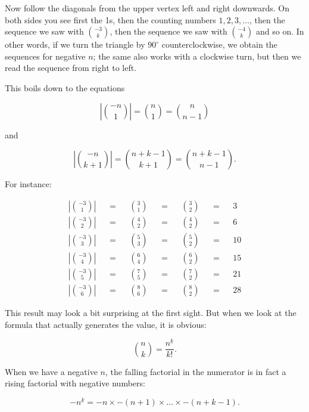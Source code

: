\documentclass[tikz]{scrreprt}
\begin{document}
Now follow the diagonals from the upper vertex
left and right downwards.
On both sides you see first the 1s,
then the counting numbers $1,2,3,\dots$,
then the sequence we saw with $\binom{-3}{k}$,
then the sequence we saw with $\binom{-4}{k}$
and so on.
In other words, if we turn the triangle
by $90^{\circ}$ counterclockwise, 
we obtain the sequences for negative $n$;
the same also works with a clockwise turn,
but then we read the sequence from right to left.

This boils down to the equations

\begin{equation}\label{eq:NegPos_1}
\left\lvert\binom{-n}{1}\right\rvert 
= \binom{n}{1}
= \binom{n}{n-1}
\end{equation}

and

\begin{equation}\label{eq:NegPos_k}
\left\lvert\binom{-n}{k+1}\right\rvert 
= \binom{n+k-1}{k+1}
= \binom{n+k-1}{n-1}.
\end{equation}

For instance:

\begin{align*}
\left\lvert\binom{-3}{1}\right\rvert &&=&&\binom{3}{1} &&=&&\binom{3}{2} &&=&& 3\\
\left\lvert\binom{-3}{2}\right\rvert &&=&&\binom{4}{2} &&=&&\binom{4}{2} &&=&& 6\\
\left\lvert\binom{-3}{3}\right\rvert &&=&&\binom{5}{3} &&=&&\binom{5}{2} &&=&& 10\\
\left\lvert\binom{-3}{4}\right\rvert &&=&&\binom{6}{4} &&=&&\binom{6}{2} &&=&& 15\\
\left\lvert\binom{-3}{5}\right\rvert &&=&&\binom{7}{5} &&=&&\binom{7}{2} &&=&& 21\\
\left\lvert\binom{-3}{6}\right\rvert &&=&&\binom{8}{6} &&=&&\binom{8}{2} &&=&& 28
\end{align*}

This result may look a bit surprising at the first sight.
But when we look at the formula that actually generates
the value, it is obvious:

\begin{equation}
\binom{n}{k} = \frac{n^{\underline{k}}}{k!}.
\end{equation}

When we have a negative $n$, the falling factorial
in the numerator is in fact a rising factorial with
negative numbers:

\[
-n^{\underline{k}} = -n \times -(n+1) \times \dots \times -(n+k-1).
\]
\end{document}
